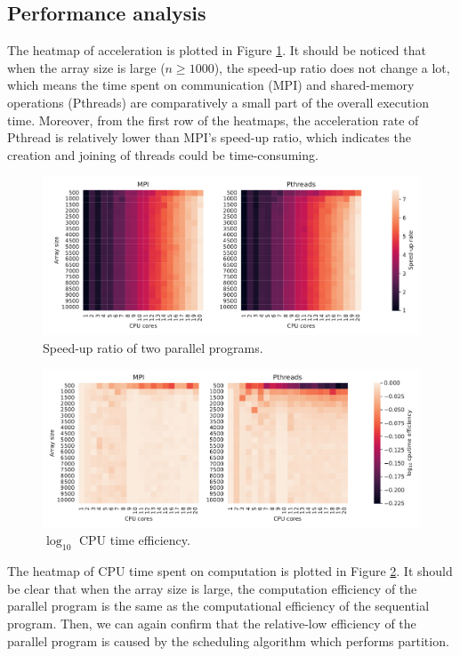 \documentclass[twoside,12pt]{article}
\theoremstyle{definition}
\theoremstyle{remark}
\begin{document}
\subsection{Performance analysis}
The heatmap of acceleration is plotted in Figure \ref{fig:heatmap-rate}.
It should be noticed that when the array size is large ($n\geq 1000$), 
the speed-up ratio does not change a lot,
which means the time spent on communication (MPI) and
shared-memory operations (Pthreads) are comparatively 
a small part of the overall execution time.
Moreover, from the first row of the heatmaps,
the acceleration rate of Pthread is relatively lower than
MPI's speed-up ratio, which indicates the creation and joining
of threads could be time-consuming.

\begin{figure}[h!]
    \centering
    \includegraphics[width=\textwidth]{../analysis/heatmap-rate.pdf}
    \caption{Speed-up ratio of two parallel programs.}
    \label{fig:heatmap-rate}
\end{figure}
\begin{figure}[h!]
    \centering
    \includegraphics[width=\textwidth]{../analysis/heatmap-cpueff.pdf}
    \caption{$\log_10$ CPU time efficiency.}
    \label{fig:heatmap-cpueff}
\end{figure}

The heatmap of CPU time spent on computation is plotted in
Figure \ref{fig:heatmap-cpueff}.
It should be clear that when the array size is large, 
the computation efficiency of the parallel program
is the same as the computational efficiency of the sequential program.
Then, we can again confirm that the relative-low efficiency
of the parallel program is caused by the scheduling algorithm
which performs partition. 
\end{document}
